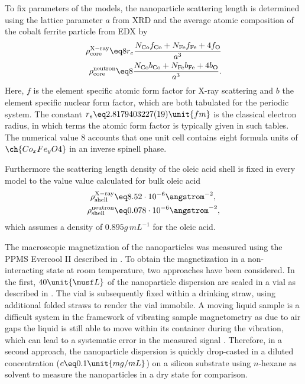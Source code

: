 \documentclass[\main/dresen_thesis.tex]{subfiles}
\begin{document}
    To fix parameters of the models, the nanoparticle scattering length is determined using the lattice parameter $a$ from XRD and the average atomic composition of the cobalt ferrite particle from EDX by
    \begin{align}
      \rho^\mathrm{X-ray}_\mathrm{core} \eq 8 r_e \frac{N_\mathrm{Co} f_\mathrm{Co} + N_\mathrm{Fe} f_\mathrm{Fe} + 4 f_\mathrm{O}}{a^3}\\
      \rho^\mathrm{neutron}_\mathrm{core} \eq 8 \frac{N_\mathrm{Co} b_\mathrm{Co} + N_\mathrm{Fe} b_\mathrm{Fe} + 4 b_\mathrm{O}}{a^3}.
    \end{align}
    Here, $f$ is the element specific atomic form factor for X-ray scattering and $b$ the element specific nuclear form factor, which are both tabulated for the periodic system.
    The constant $r_e \eq 2.8179403227(19) \unit{fm}$ is the classical electron radius, in which terms the atomic form factor is typically given in such tables.
    The numerical value $8$ accounts that one unit cell contains eight formula units of $\ch{Co_xFe_yO4}$ in an inverse spinell phase.

    Furthermore the scattering length density of the oleic acid shell is fixed in every model to the value value calculated for bulk oleic acid
    \begin{align}
      \rho^\mathrm{X-ray}_\mathrm{shell} &\eq 8.52 \cdot 10^{-6} \angstrom^{-2},\\
      \rho^\mathrm{neutron}_\mathrm{shell} &\eq 0.078 \cdot 10^{-6} \angstrom^{-2},
    \end{align}
    which assumes a density of $0.895 \unit{g\,mL^{-1}}$ for the oleic acid.

    The macroscopic magnetization of the nanoparticles was measured using the PPMS Evercool II described in .
    To obtain the magnetization in a non-interacting state at room temperature, two approaches have been considered.
    In the first, $40 \unit{\musf L}$ of the nanoparticle dispersion are sealed in a vial as described in .
    The vial is subsequently fixed within a drinking straw, using additional folded straws to render the vial immobile.
    A moving liquid sample is a difficult system in the framework of vibrating sample magnetometry as due to air gaps the liquid is still able to move within its container during the vibration, which can lead to a systematic error in the measured signal \cite{Boekelheide_2016_Artif}.
    Therefore, in a second approach, the nanoparticle dispersion is quickly drop-casted in a diluted concentration ($c \eq 0.1 \unit{mg/mL}$) on a silicon substrate using $\textit{n}$-hexane as solvent to measure the nanoparticles in a dry state for comparison.
\end{document}
